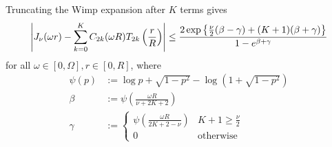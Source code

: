 \begin{lemma} \label{lem:wimp} Truncating the Wimp expansion after $K$ terms
    gives
    \begin{equation}
        \left|J_\nu(\omega r) - \sum_{k=0}^K C_{2k}(\omega R) T_{2k}\left( \frac{r}{R} \right)\right| 
        \leq \frac{2\exp\left\{ \frac{\nu}{2}(\beta - \gamma) + (K+1)(\beta + \gamma) \right\}}{1 - e^{\beta + \gamma}}
    \end{equation}
    for all $\omega \in [0, \Omega], r \in [0, R]$, where
    \begin{align}
        \psi(p) &:= \log p + \sqrt{1 - p^2} - \log\left( 1 + \sqrt{1 - p^2} \right) \\
        \beta &:= \psi\left( \frac{\omega R}{\nu + 2K + 2} \right) \\
        \gamma &:= \begin{cases}
            \psi\left( \frac{\omega R}{2K + 2 - \nu} \right) & K + 1 \geq \frac{\nu}{2} \\
            0 & \text{otherwise}
        \end{cases}
    \end{align}
\end{lemma}
